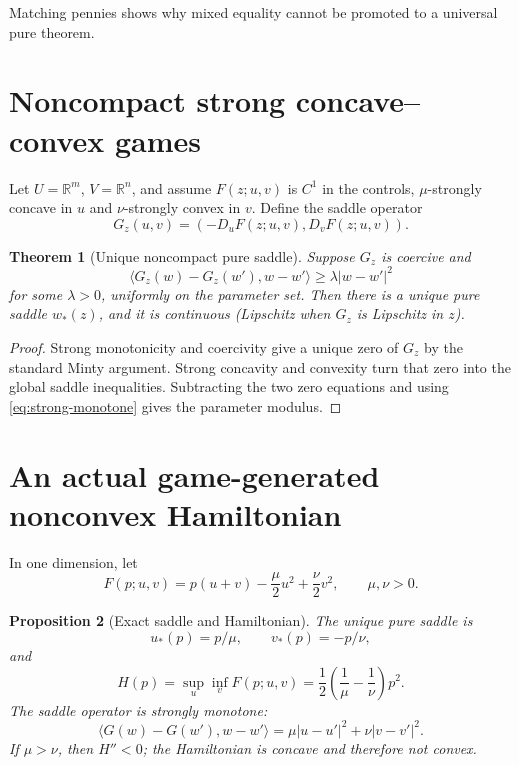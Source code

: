 \documentclass[11pt,reqno]{amsart}
\newtheorem{theorem}{Theorem}[section]
\newtheorem{proposition}[theorem]{Proposition}
\theoremstyle{definition}
\theoremstyle{remark}
\newcommand{\R}{\mathbb R}
\newcommand{\abs}[1]{\left\lvert #1\right\rvert}
\begin{document}
Matching pennies shows why mixed equality cannot be promoted to a universal
pure theorem.

\section{Noncompact strong concave--convex games}\label{sec:noncompact}

Let $U=\R^m$, $V=\R^n$, and assume $F(z;u,v)$ is $C^1$ in the controls,
$\mu$-strongly concave in $u$ and $\nu$-strongly convex in $v$.  Define the
saddle operator
\[
 G_z(u,v)=(-D_uF(z;u,v),D_vF(z;u,v)).
\]

\begin{theorem}[Unique noncompact pure saddle]\label{thm:strong-saddle}
Suppose $G_z$ is coercive and
\begin{equation}\label{eq:strong-monotone}
 \langle G_z(w)-G_z(w'),w-w'\rangle
 \ge\lambda\abs{w-w'}^2
\end{equation}
for some $\lambda>0$, uniformly on the parameter set.  Then there is a unique
pure saddle $w_*(z)$, and it is continuous (Lipschitz when $G_z$ is Lipschitz
in $z$).
\end{theorem}

\begin{proof}
Strong monotonicity and coercivity give a unique zero of $G_z$ by the standard
Minty argument.  Strong concavity and convexity turn that zero into the global
saddle inequalities.  Subtracting the two zero equations and using
\eqref{eq:strong-monotone} gives the parameter modulus.
\end{proof}

\section{An actual game-generated nonconvex Hamiltonian}\label{sec:quadratic}

In one dimension, let
\begin{equation}\label{eq:quadratic-F}
 F(p;u,v)=p(u+v)-\frac\mu2u^2+\frac\nu2v^2,
 \qquad \mu,\nu>0.
\end{equation}

\begin{proposition}[Exact saddle and Hamiltonian]\label{prop:quadratic}
The unique pure saddle is
\[
 u_*(p)=p/\mu,
 \qquad v_*(p)=-p/\nu,
\]
and
\begin{equation}\label{eq:Hquad}
 H(p)=\sup_u\inf_vF(p;u,v)
 =\frac12\left(\frac1\mu-\frac1\nu\right)p^2.
\end{equation}
The saddle operator is strongly monotone:
\[
 \langle G(w)-G(w'),w-w'\rangle
 =\mu\abs{u-u'}^2+\nu\abs{v-v'}^2.
\]
If $\mu>\nu$, then $H''<0$; the Hamiltonian is concave and therefore not
convex.
\end{proposition}
\end{document}

